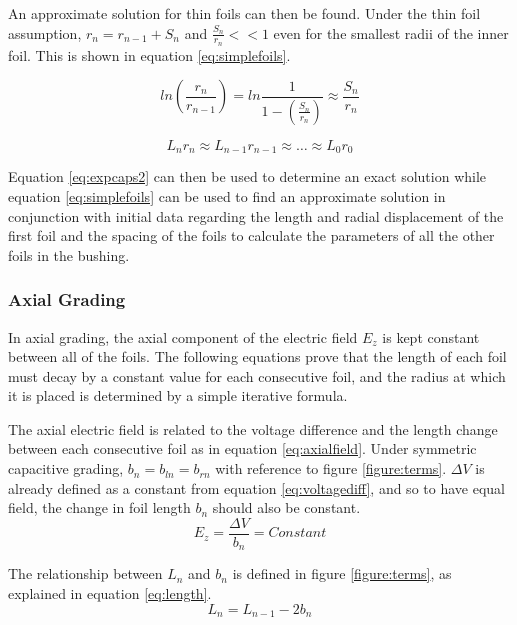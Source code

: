 An approximate solution for thin foils can then be found.
Under the thin foil assumption, $r_{n} = r_{n-1} + S_n$ and $\displaystyle\frac{S_n}{r_n}<<1$ even for the smallest radii of the inner foil.
This is shown in equation \ref{eq:simplefoils}.

\begin{equation}
   \label{eq:simplify}
   ln(\displaystyle\frac{r_n}{r_{n-1}}) = ln\displaystyle\frac{1}{1-(\displaystyle\frac{S_n}{r_n})} \approx \displaystyle\frac{S_n}{r_n}
\end{equation}

\begin{equation}
   \label{eq:simplefoils}
   L_{n}r_{n} \approx L_{n-1}r_{n-1} \approx \dots \approx L_{0}r_{0}
\end{equation}

Equation \ref{eq:expcaps2} can then be used to determine an exact solution while equation \ref{eq:simplefoils} can be used to find an approximate solution in conjunction with initial data regarding the length and radial displacement of the first foil and the spacing of the foils to calculate the parameters of all the other foils in the bushing.

\subsubsection{Axial Grading}
In axial grading, the axial component of the electric field $E_z$ is kept constant between all of the foils. 
The following equations prove that the length of each foil must decay by a constant value for each consecutive foil, and the radius at which it is placed is determined by a simple iterative formula.

The axial electric field is related to the voltage difference and the length change between each consecutive foil as in equation \ref{eq:axialfield}. 
Under symmetric capacitive grading, $b_n = b_{ln} = b_{rn}$ with reference to figure \ref{figure:terms}. 
$\Delta V$ is already defined as a constant from equation \ref{eq:voltagediff}, and so to have equal field, the change in foil length $b_n$ should also be constant.
\begin{equation}
   \label{eq:axialfield}
   E_z = \displaystyle\frac{\Delta V}{b_n} = Constant
\end{equation}

The relationship between $L_n$ and $b_n$ is defined in figure \ref{figure:terms}, as explained in equation \ref{eq:length}.
\begin{equation}
   \label{eq:length}
   L_n = L_{n-1} - 2b_n
\end{equation}

